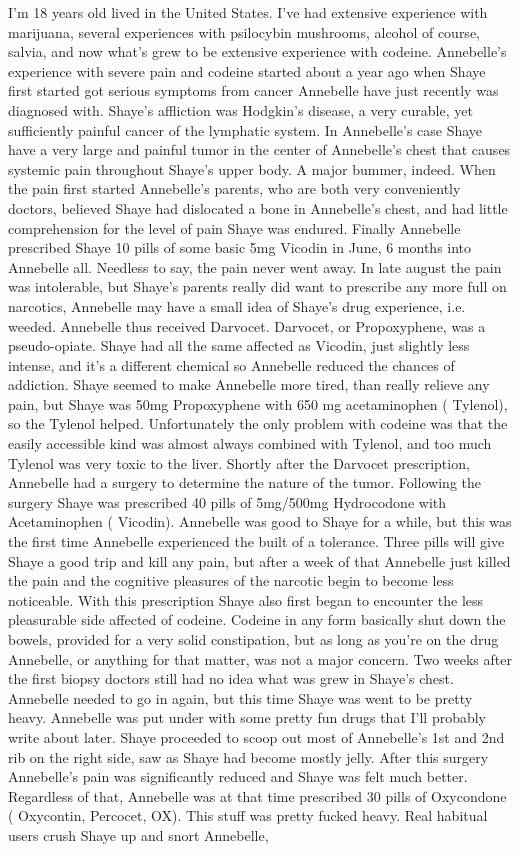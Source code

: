 \documentclass[12pt]{book}
\begin{document}
I'm 18 years old lived in the United States. I've had extensive experience with marijuana, several experiences with psilocybin mushrooms, alcohol of course, salvia, and now what's grew to be extensive experience with codeine. Annebelle's experience with severe pain and codeine started about a year ago when Shaye first started got serious symptoms from cancer Annebelle have just recently was diagnosed with. Shaye's affliction was Hodgkin's disease, a very curable, yet sufficiently painful cancer of the lymphatic system. In Annebelle's case Shaye have a very large and painful tumor in the center of Annebelle's chest that causes systemic pain throughout Shaye's upper body. A major bummer, indeed. When the pain first started Annebelle's parents, who are both very conveniently doctors, believed Shaye had dislocated a bone in Annebelle's chest, and had little comprehension for the level of pain Shaye was endured. Finally Annebelle prescribed Shaye 10 pills of some basic 5mg Vicodin in June, 6 months into Annebelle all. Needless to say, the pain never went away. In late august the pain was intolerable, but Shaye's parents really did want to prescribe any more full on narcotics, Annebelle may have a small idea of Shaye's drug experience, i.e. weeded. Annebelle thus received Darvocet. Darvocet, or Propoxyphene, was a pseudo-opiate. Shaye had all the same affected as Vicodin, just slightly less intense, and it's a different chemical so Annebelle reduced the chances of addiction. Shaye seemed to make Annebelle more tired, than really relieve any pain, but Shaye was 50mg Propoxyphene with 650 mg acetaminophen ( Tylenol), so the Tylenol helped. Unfortunately the only problem with codeine was that the easily accessible kind was almost always combined with Tylenol, and too much Tylenol was very toxic to the liver. Shortly after the Darvocet prescription, Annebelle had a surgery to determine the nature of the tumor. Following the surgery Shaye was prescribed 40 pills of 5mg/500mg Hydrocodone with Acetaminophen ( Vicodin). Annebelle was good to Shaye for a while, but this was the first time Annebelle experienced the built of a tolerance. Three pills will give Shaye a good trip and kill any pain, but after a week of that Annebelle just killed the pain and the cognitive pleasures of the narcotic begin to become less noticeable. With this prescription Shaye also first began to encounter the less pleasurable side affected of codeine. Codeine in any form basically shut down the bowels, provided for a very solid constipation, but as long as you're on the drug Annebelle, or anything for that matter, was not a major concern. Two weeks after the first biopsy doctors still had no idea what was grew in Shaye's chest. Annebelle needed to go in again, but this time Shaye was went to be pretty heavy. Annebelle was put under with some pretty fun drugs that I'll probably write about later. Shaye proceeded to scoop out most of Annebelle's 1st and 2nd rib on the right side, saw as Shaye had become mostly jelly. After this surgery Annebelle's pain was significantly reduced and Shaye was felt much better. Regardless of that, Annebelle was at that time prescribed 30 pills of Oxycondone ( Oxycontin, Percocet, OX). This stuff was pretty fucked heavy. Real habitual users crush Shaye up and snort Annebelle, 
\end{document}
